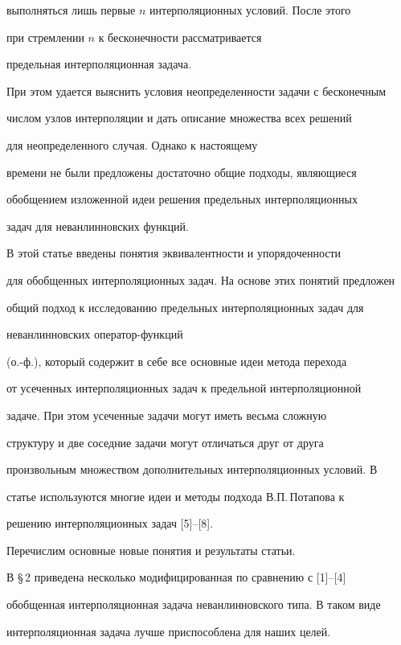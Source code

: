 выполняться лишь первые $n$ интерполяционных условий. После этого


при стремлении $n$ к бесконечности рассматривается


предельная интерполяционная задача.


При этом удается выяснить условия неопределенности задачи с бесконечным


числом узлов интерполяции и дать описание множества всех решений


для неопределенного случая. Однако к настоящему


времени не были предложены достаточно общие подходы, являющиеся


обобщением изложенной идеи решения предельных интерполяционных


задач для неванлинновских функций.





В этой статье введены понятия эквивалентности и упорядоченности


для обобщенных интерполяционных задач. На основе этих понятий предложен


общий подход к исследованию предельных интерполяционных задач для


неванлинновских оператор-функций


(о.-ф.), который содержит в себе все основные идеи метода перехода


от усеченных интерполяционных задач к предельной интерполяционной


задаче. При этом усеченные задачи могут иметь весьма сложную


структуру и две соседние задачи могут отличаться друг от друга


произвольным множеством дополнительных интерполяционных условий. В


статье используются многие идеи и методы подхода В.П.\,Потапова к


решению интерполяционных задач [5]--[8].





Перечислим основные новые понятия и результаты статьи.





В \S\,2 приведена несколько модифицированная по сравнению с [1]--[4]


обобщенная интерполяционная задача неванлинновского типа. В таком виде


интерполяционная задача лучше приспособлена для наших целей.





